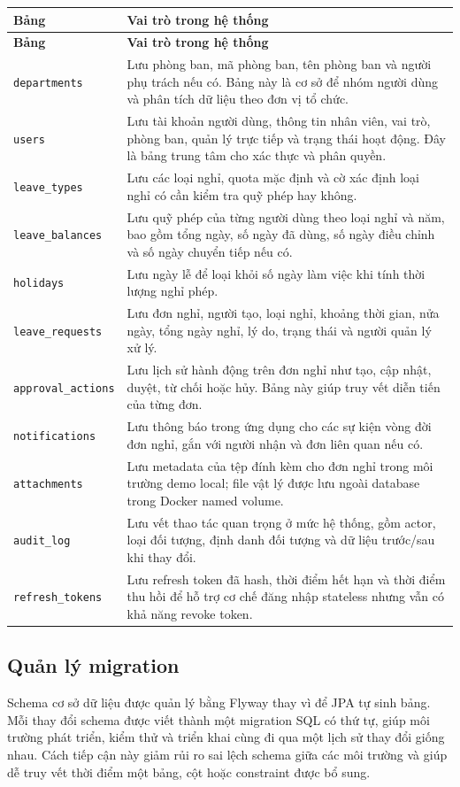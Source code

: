 \begin{longtable}{p{}p{}}
\toprule
\textbf{Bảng} & \textbf{Vai trò trong hệ thống} \\
\midrule
\endfirsthead
\toprule
\textbf{Bảng} & \textbf{Vai trò trong hệ thống} \\
\midrule
\endhead
\texttt{departments} & Lưu phòng ban, mã phòng ban, tên phòng ban và người phụ trách nếu có. Bảng này là cơ sở để nhóm người dùng và phân tích dữ liệu theo đơn vị tổ chức. \\
\texttt{users} & Lưu tài khoản người dùng, thông tin nhân viên, vai trò, phòng ban, quản lý trực tiếp và trạng thái hoạt động. Đây là bảng trung tâm cho xác thực và phân quyền. \\
\texttt{leave\_types} & Lưu các loại nghỉ, quota mặc định và cờ xác định loại nghỉ có cần kiểm tra quỹ phép hay không. \\
\texttt{leave\_balances} & Lưu quỹ phép của từng người dùng theo loại nghỉ và năm, bao gồm tổng ngày, số ngày đã dùng, số ngày điều chỉnh và số ngày chuyển tiếp nếu có. \\
\texttt{holidays} & Lưu ngày lễ để loại khỏi số ngày làm việc khi tính thời lượng nghỉ phép. \\
\texttt{leave\_requests} & Lưu đơn nghỉ, người tạo, loại nghỉ, khoảng thời gian, nửa ngày, tổng ngày nghỉ, lý do, trạng thái và người quản lý xử lý. \\
\texttt{approval\_actions} & Lưu lịch sử hành động trên đơn nghỉ như tạo, cập nhật, duyệt, từ chối hoặc hủy. Bảng này giúp truy vết diễn tiến của từng đơn. \\
\texttt{notifications} & Lưu thông báo trong ứng dụng cho các sự kiện vòng đời đơn nghỉ, gắn với người nhận và đơn liên quan nếu có. \\
\texttt{attachments} & Lưu metadata của tệp đính kèm cho đơn nghỉ trong môi trường demo local; file vật lý được lưu ngoài database trong Docker named volume. \\
\texttt{audit\_log} & Lưu vết thao tác quan trọng ở mức hệ thống, gồm actor, loại đối tượng, định danh đối tượng và dữ liệu trước/sau khi thay đổi. \\
\texttt{refresh\_tokens} & Lưu refresh token đã hash, thời điểm hết hạn và thời điểm thu hồi để hỗ trợ cơ chế đăng nhập stateless nhưng vẫn có khả năng revoke token. \\
\bottomrule
\end{longtable}

\subsection{Quản lý migration}
Schema cơ sở dữ liệu được quản lý bằng Flyway thay vì để JPA tự sinh bảng. Mỗi thay đổi schema được viết thành một migration SQL có thứ tự, giúp môi trường phát triển, kiểm thử và triển khai cùng đi qua một lịch sử thay đổi giống nhau. Cách tiếp cận này giảm rủi ro sai lệch schema giữa các môi trường và giúp dễ truy vết thời điểm một bảng, cột hoặc constraint được bổ sung.


